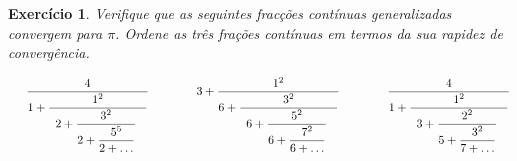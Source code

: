 \documentclass{article}
\newtheorem{ex}{Exercício}[section]
\begin{document}
\begin{ex}
Verifique que as seguintes fracções contínuas generalizadas convergem para $\pi$. Ordene as três frações contínuas em termos da sua rapidez de convergência.  

 \[
\hspace{0.5cm}
\displaystyle{ \frac{4 }
{ 1+\displaystyle{\frac{1^2}{ 
                           {\begin{array}{l}
                              2+\displaystyle{ \frac{3^2}{2+ \displaystyle \frac{5^5}{2+\ldots } }  }\,\, 
                           \end{array}
                           }
                           }}}} \qquad \qquad 
                              3+
\displaystyle{ \frac{1^2 }
{ 6+\displaystyle{\frac{3^2}{ 
                        {\begin{array}{l}
                              6+\displaystyle{ \frac{5^2}{6+ \displaystyle \frac{7^2}{6+\ldots } }  }\,\, 
                             \end{array}
                             }
                             }}}}      \qquad \qquad      
\displaystyle{ \frac{4 }
{ 1+\displaystyle{\frac{1^2}{ 
                          {\begin{array}{l}
                      3+\displaystyle{ \frac{2^2}{5+ \displaystyle \frac{3^2}{7+\ldots } }  }\,\, 
                        \end{array}
                         }
                          }}}}                                                   
\]
\end{ex}
\end{document}
